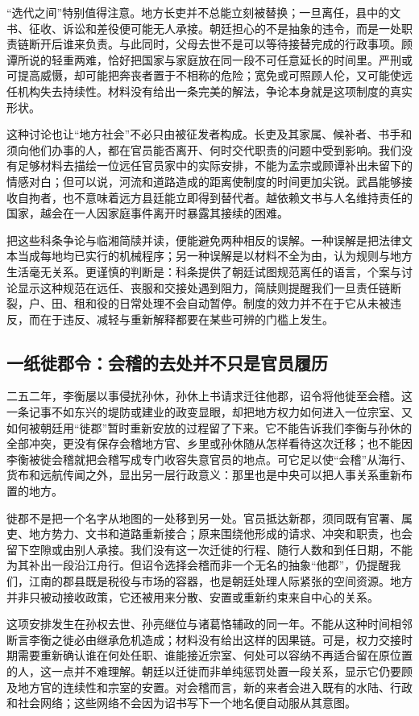 “选代之间”特别值得注意。地方长吏并不总能立刻被替换；一旦离任，县中的文书、征收、诉讼和差役便可能无人承接。朝廷担心的不是抽象的违令，而是一处职责链断开后谁来负责。与此同时，父母去世不是可以等待接替完成的行政事项。顾谭所说的轻重两难，恰好把国家与家庭放在同一段不可任意延长的时间里。严刑或可提高威慑，却可能把奔丧者置于不相称的危险；宽免或可照顾人伦，又可能使远任机构失去持续性。材料没有给出一条完美的解法，争论本身就是这项制度的真实形状。

这种讨论也让“地方社会”不必只由被征发者构成。长吏及其家属、候补者、书手和须向他们办事的人，都在官员能否离开、何时交代职责的问题中受到影响。我们没有足够材料去描绘一位远任官员家中的实际安排，不能为孟宗或顾谭补出未留下的情感对白；但可以说，河流和道路造成的距离使制度的时间更加尖锐。武昌能够接收自拘者，也不意味着远方县廷能立即得到替代者。越依赖文书与人名维持责任的国家，越会在一人因家庭事件离开时暴露其接续的困难。

把这些科条争论与临湘简牍并读，便能避免两种相反的误解。一种误解是把法律文本当成每地均已实行的机械程序；另一种误解是以材料不全为由，认为规则与地方生活毫无关系。更谨慎的判断是：科条提供了朝廷试图规范离任的语言，个案与讨论显示这种规范在远任、丧服和交接处遇到阻力，简牍则提醒我们一旦责任链断裂，户、田、租和役的日常处理不会自动暂停。制度的效力并不在于它从未被违反，而在于违反、减轻与重新解释都要在某些可辨的门槛上发生。
\subsection{一纸徙郡令：会稽的去处并不只是官员履历}
二五二年，李衡屡以事侵扰孙休，孙休上书请求迁往他郡，诏令将他徙至会稽。这一条记事不如东兴的堤防或建业的政变显眼，却把地方权力如何进入一位宗室、又如何被朝廷用“徙郡”暂时重新安放的过程留了下来。它不能告诉我们李衡与孙休的全部冲突，更没有保存会稽地方官、乡里或孙休随从怎样看待这次迁移；也不能因李衡被徙会稽就把会稽写成专门收容失意官员的地点。可它足以使“会稽”从海行、货布和远航传闻之外，显出另一层行政意义：那里也是中央可以把人事关系重新布置的地方。

徙郡不是把一个名字从地图的一处移到另一处。官员抵达新郡，须同既有官署、属吏、地方势力、文书和道路重新接合；原来围绕他形成的请求、冲突和职责，也会留下空隙或由别人承接。我们没有这一次迁徙的行程、随行人数和到任日期，不能为其补出一段沿江舟行。但诏令选择会稽而非一个无名的抽象“他郡”，仍提醒我们，江南的郡县既是税役与市场的容器，也是朝廷处理人际紧张的空间资源。地方并非只被动接收政策，它还被用来分散、安置或重新约束来自中心的关系。

这项安排发生在孙权去世、孙亮继位与诸葛恪辅政的同一年。不能从这种时间相邻断言李衡之徙必由继承危机造成；材料没有给出这样的因果链。可是，权力交接时期需要重新确认谁在何处任职、谁能接近宗室、何处可以容纳不再适合留在原位置的人，这一点并不难理解。朝廷以迁徙而非单纯惩罚处置一段关系，显示它仍要顾及地方官的连续性和宗室的安置。对会稽而言，新的来者会进入既有的水陆、行政和社会网络；这些网络不会因为诏书写下一个地名便自动服从其意图。

